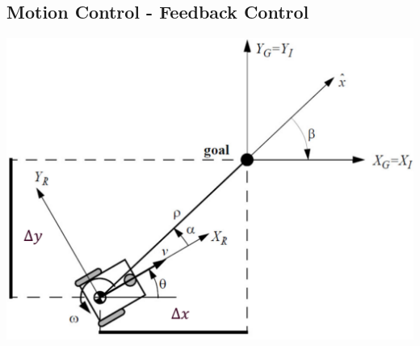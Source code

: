 \subsection{Motion Control - Feedback Control}
\includegraphics[width=\linewidth]{./Figures/03_MotionControl.png}
